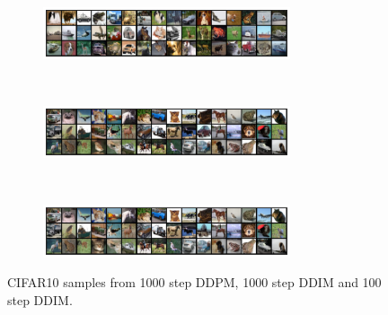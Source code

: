 \begin{figure}
    \centering
    \begin{subfigure}{\textwidth}
    \centering
    \includegraphics[width=0.8\textwidth]{figures/cifar10-samples-uniform-1000-ddpm.pdf}
    \end{subfigure}
    ~
    \begin{subfigure}{\textwidth}
    \centering
    \includegraphics[width=0.8\textwidth]{figures/cifar10-samples-pt-1000-ddim.pdf}
    \end{subfigure}
    ~
    \begin{subfigure}{\textwidth}
    \centering
    \includegraphics[width=0.8\textwidth]{figures/cifar10-samples-quad-100-ddim.pdf}
    \end{subfigure}
    \caption{CIFAR10 samples from 1000 step DDPM, 1000 step DDIM and 100 step DDIM.}
    \label{fig:cifar10-samples}
\end{figure}

